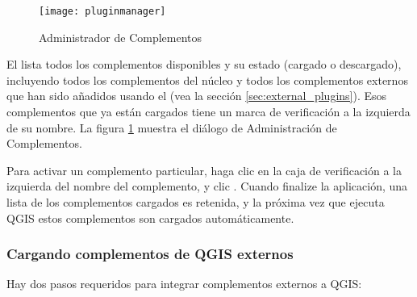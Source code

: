 \begin{figure}[ht]
   \begin{center}
   \caption{Administrador de Complementos \nixcaption}\label{fig:pluginmanager}\smallskip
   \texttt{[image: pluginmanager]}
\end{center}
\end{figure}

El  lista todos los complementos disponibles y su estado (cargado o descargado), 
incluyendo todos los complementos del núcleo y todos los complementos externos que han sido añadidos usando el  
(vea la sección \ref{sec:external_plugins}). Esos complementos que ya están cargados tiene un marca de verificación 
a la izquierda de su nombre. La figura \ref{fig:pluginmanager} muestra el diálogo de Administración de Complementos.

Para activar un complemento particular, haga clic en la caja de verificación a la izquierda del nombre del complemento, y clic . 
Cuando finalize la aplicación, una lista de los complementos cargados es retenida, y la próxima vez 
que ejecuta QGIS estos complementos son cargados automáticamente.

\begin{Tip}\caption{\textsc{Complementos defectuosos}}
\end{Tip} 

\subsubsection{Cargando complementos de QGIS externos}\label{sec:load_external_plugin} 

Hay dos pasos requeridos para integrar complementos externos a QGIS: 


